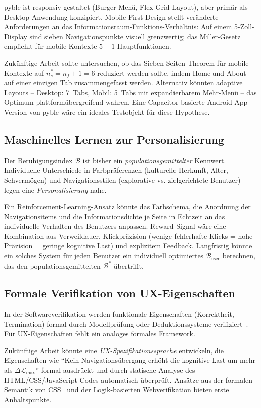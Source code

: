 ﻿\documentclass[a4paper,12pt]{article}
\theoremstyle{definition}
\begin{document}
pyble ist responsiv gestaltet (Burger-Menü, Flex-Grid-Layout), aber
primär als Desktop-Anwendung konzipiert. Mobile-First-Design stellt
veränderte Anforderungen an das Informationsraum-Funktions-Verhältnis:
Auf einem 5-Zoll-Display sind sieben Navigationspunkte visuell grenzwertig;
das Miller-Gesetz~\cite{miller1956} empfiehlt für mobile Kontexte $5 \pm 1$
Hauptfunktionen.

Zukünftige Arbeit sollte untersuchen, ob das Sieben-Seiten-Theorem für
mobile Kontexte auf $n_s^* = n_f + 1 = 6$ reduziert werden sollte,
indem Home und About auf einer einzigen Tab zusammengefasst werden.
Alternativ könnten adaptive Layouts -- Desktop: 7~Tabs, Mobil: 5~Tabs
mit expandierbarem Mehr-Menü -- das Optimum plattformübergreifend wahren.
Eine Capacitor-basierte Android-App-Version von pyble wäre ein
ideales Testobjekt für diese Hypothese.

\subsection{Maschinelles Lernen zur Personalisierung}

Der Beruhigungsindex $\mathcal{B}$ ist bisher ein \emph{populationsgemittelter}
Kennwert. Individuelle Unterschiede in Farbpräferenzen (kulturelle Herkunft,
Alter, Sehvermögen) und Navigationsstilen (explorative vs. zielgerichtete
Benutzer) legen eine \emph{Personalisierung} nahe.

Ein Reinforcement-Learning-Ansatz könnte das Farbschema, die Anordnung
der Navigationsitems und die Informationsdichte je Seite in Echtzeit an
das individuelle Verhalten des Benutzers anpassen. Reward-Signal wäre
eine Kombination aus Verweildauer, Klickpräzision (wenige fehlerhafte
Klicks = hohe Präzision = geringe kognitive Last) und explizitem Feedback.
Langfristig könnte ein solches System für jeden Benutzer ein individuell
optimiertes $\mathcal{B}_{\text{user}}$ berechnen, das den
populationsgemittelten $\mathcal{B}^*$ übertrifft.

\subsection{Formale Verifikation von UX-Eigenschaften}

In der Softwareverifikation werden funktionale Eigenschaften (Korrektheit,
Termination) formal durch Modellprüfung oder Deduktionssysteme verifiziert~\cite{dijkstra1982}.
Für UX-Eigenschaften fehlt ein analoges formales Framework.

Zukünftige Arbeit könnte eine \emph{UX-Spezifikationssprache} entwickeln,
die Eigenschaften wie \enquote{Kein Navigationsübergang erhöht die kognitive
Last um mehr als $\Delta\mathcal{L}_{\max}$} formal ausdrückt und durch
statische Analyse des HTML/CSS/JavaScript-Codes automatisch überprüft.
Ansätze aus der formalen Semantik von CSS~\cite{celik2016} und der
Logik-basierten Webverifikation bieten erste Anhaltspunkte.
\end{document}
